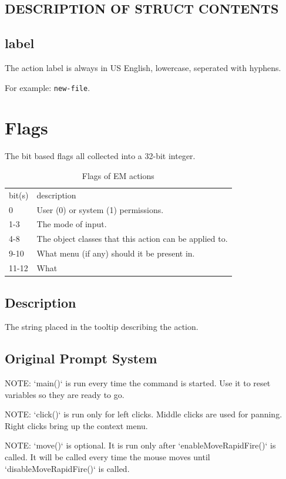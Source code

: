 \documentclass[a4paper]{report}
\begin{document}
\subsection{DESCRIPTION OF STRUCT CONTENTS}

\subsection{label}

The action label is always in US English, lowercase,
seperated with hyphens.

For example: \texttt{new-file}.

\section{Flags}

The bit based flags all collected into a 32-bit integer.

\begin{table}
\begin{tabular}{l l}
bit(s) & description \\
0 & User (0) or system (1) permissions. \\
1-3 & The mode of input. \\
4-8 & The object classes that this action can be applied to. \\
9-10 & What menu (if any) should it be present in. \\ 
11-12 & What
\end{tabular}
\caption{Flags of EM actions}
\end{table}

\subsection{Description}

The string placed in the tooltip describing the action.

\subsection{Original Prompt System}

NOTE: `main()` is run every time the command is started.
Use it to reset variables so they are ready to go.

NOTE: `click()` is run only for left clicks.
Middle clicks are used for panning.
Right clicks bring up the context menu.

NOTE: `move()` is optional. It is run only after
`enableMoveRapidFire()` is called. It
will be called every time the mouse moves until
`disableMoveRapidFire()` is called.
\end{document}

